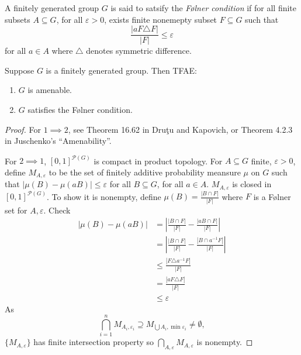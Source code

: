 \documentclass[a4paper]{article}
\begin{document}
\begin{definition}
  A finitely generated group \(G\) is said to satsify the \emph{Følner condition} if for all finite subsets \(A \subseteq G\), for all \(\varepsilon > 0\), exists finite nonemepty subset \(F \subseteq G\) such that
  \[
    \frac{|aF \triangle F|}{|F|} \leq \varepsilon
  \]
  for all \(a \in A\) where \(\triangle\) denotes symmetric difference.
\end{definition}

\begin{theorem}
  Suppose \(G\) is a finitely generated group. Then TFAE:
  \begin{enumerate}
  \item \(G\) is amenable.
  \item \(G\) satisfies the Følner condition.
  \end{enumerate}
\end{theorem}

\begin{proof}
  For \(1 \implies 2\), see Theorem 16.62 in Druţu and Kapovich, or Theorem 4.2.3 in Juschenko's ``Amenability''.

  For \(2 \implies 1\), \([0, 1]^{\mathcal P(G)}\) is compact in product topology. For \(A \subseteq G\) finite, \(\varepsilon > 0\), define \(M_{A, \varepsilon}\) to be the set of finitely additive probability meansure \(\mu\) on \(G\) such that \(|\mu(B) - \mu(a B)| \leq \varepsilon\) for all \(B \subseteq G\), for all \(a \in A\). \(M_{A, \varepsilon}\) is closed in \([0, 1]^{\mathcal P(G)}\). To show it is nonempty, define \(\mu(B) = \frac{|B \cap F|}{|F|}\) where \(F\) is a Følner set for \(A, \varepsilon\). Check
    \begin{align*}
      |\mu(B) - \mu(aB)|
      &= \left|\frac{|B \cap F|}{|F|} - \frac{|aB \cap F|}{|F|}\right| \\
      &= \left|\frac{|B \cap F|}{|F|} - \frac{|B \cap a^{-1} F|}{|F|}\right| \\
      &\leq \frac{|F \triangle a^{-1}F|}{|F|} \\
      &= \frac{|aF \triangle F|}{|F|} \\
      &\leq \varepsilon
    \end{align*}
    As
    \[
      \bigcap_{i = 1}^n M_{A_i, \varepsilon_i} \supseteq M_{\bigcup A_i, \min \varepsilon_i} \ne \emptyset,
    \]
    \(\{M_{A, \varepsilon}\}\) has finite intersection property so \(\bigcap_{A, \varepsilon} M_{A, \varepsilon}\) is nonempty.
\end{proof}
\end{document}
